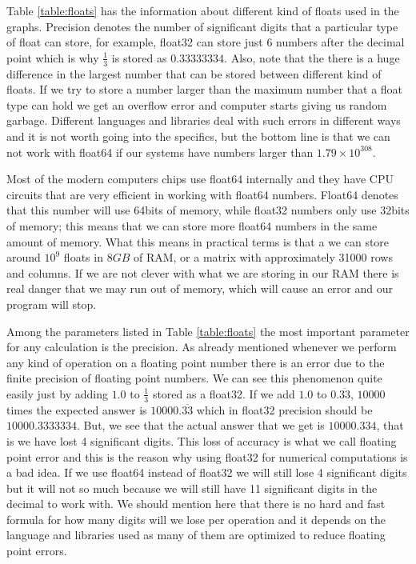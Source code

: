 Table \ref{table:floats} has the information about different kind of floats used in the graphs. Precision denotes the number of significant digits that a particular type of float can store, for example, float32 can store just 6 numbers after the decimal point which is why $\frac{1}{3}$ is stored as $0.33333334$. Also, note that the there is a huge difference in the largest number that can be stored between different kind of floats. If we try to store a number larger than the maximum number that a float type can hold we get an overflow error and computer starts giving us random garbage. Different languages and libraries deal with such errors in different ways and it is not worth going into the specifics, but the bottom line is that we can not work with float64 if our systems have numbers larger than $1.79\times 10^{308}$.


Most of the modern computers chips use float64 internally and they have CPU circuits that are very efficient in working with float64 numbers. Float64 denotes that this number will use 64bits of memory, while float32 numbers only use 32bits of memory; this means that we can store more float64 numbers in the same amount of memory. What this means in practical terms is that a we can store around $10^9$ floats in $8GB$ of RAM, or a matrix with approximately 31000 rows and columns. If we are not clever with what we are storing in our RAM there is real danger that we may run out of memory, which will cause an error and our program will stop.


Among the parameters listed in Table \ref{table:floats} the most important parameter for any calculation is the precision. As already mentioned whenever we perform any kind of operation on a floating point number there is an error due to the finite precision of floating point numbers.
We can see this phenomenon quite easily just by adding $1.0$ to $\frac{1}{3}$ stored as a float32. If we add $1.0$ to $0.\overline{33}$, $10000$ times the expected answer is $10000.\overline{33}$ which in float32 precision should be $10000.3333334$. But, we see that the actual answer that we get is $10000.334$, that is we have lost 4 significant digits.
This loss of accuracy is what we call floating point error and this is the reason why using float32 for numerical computations is a bad idea. If we use float64 instead of float32 we will still lose 4 significant digits but it will not so much because we will still have 11 significant digits in the decimal to work with. We should mention here that there is no hard and fast formula for how many digits will we lose per operation and it depends on the language and libraries used as many of them are optimized to reduce floating point errors.\label{para:addition_errors}

